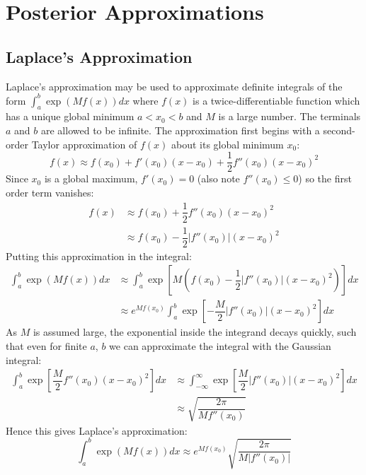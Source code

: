 \documentclass[11pt]{report} %
\begin{document}
\section{Posterior Approximations}

\subsection{Laplace's Approximation}

Laplace's approximation may be used to approximate definite integrals of the form $\int_{a}^{b}\exp\left(Mf\left(x\right)\right)dx$ where $f\left(x\right)$ is a twice-differentiable function which has a unique global minimum $a < x_{0} < b$ and $M$ is a large number. The terminals $a$ and $b$ are allowed to be infinite. The approximation first begins with a second-order Taylor approximation of $f\left(x\right)$ about its global minimum $x_{0}$:
\begin{equation}
f\left(x\right) \approx f\left(x_{0}\right) + f'\left(x_{0}\right)\left(x - x_{0}\right) + \dfrac{1}{2}f''\left(x_{0}\right)\left(x - x_{0}\right)^{2}
\end{equation}
Since $x_{0}$ is a global maximum, $f'\left(x_{0}\right) = 0$ (also note $f''\left(x_{0}\right) \leq 0$) so the first order term vanishes:
\begin{align}
f\left(x\right) &\approx f\left(x_{0}\right) + \dfrac{1}{2}f''\left(x_{0}\right)\left(x - x_{0}\right)^{2} \\
&\approx f\left(x_{0}\right) - \dfrac{1}{2}\left|f''\left(x_{0}\right)\right|\left(x - x_{0}\right)^{2}
\end{align}
Putting this approximation in the integral:
\begin{align}
\int_{a}^{b}\exp\left(Mf\left(x\right)\right)dx &\approx \int_{a}^{b}\exp\left[M\left(f\left(x_{0}\right) - \dfrac{1}{2}\left|f''\left(x_{0}\right)\right|\left(x - x_{0}\right)^{2}\right)\right]dx \\
&\approx e^{Mf\left(x_{0}\right)}\int_{a}^{b}\exp\left[-\dfrac{M}{2}\left|f''\left(x_{0}\right)\right|\left(x - x_{0}\right)^{2}\right]dx
\end{align}
As $M$ is assumed large, the exponential inside the integrand decays quickly, such that even for finite $a$, $b$ we can approximate the integral with the Gaussian integral:
\begin{align}
\int_{a}^{b}\exp\left[\dfrac{M}{2}f''\left(x_{0}\right)\left(x - x_{0}\right)^{2}\right]dx &\approx \int_{-\infty}^{\infty}\exp\left[\dfrac{M}{2}\left|f''\left(x_{0}\right)\right|\left(x - x_{0}\right)^{2}\right]dx \\
&\approx \sqrt{\dfrac{2\pi}{Mf''\left(x_{0}\right)}}
\end{align}
Hence this gives Laplace's approximation:
\begin{equation}
\int_{a}^{b}\exp\left(Mf\left(x\right)\right)dx \approx e^{Mf\left(x_{0}\right)}\sqrt{\dfrac{2\pi}{M\left|f''\left(x_{0}\right)\right|}}
\end{equation}
\end{document}
